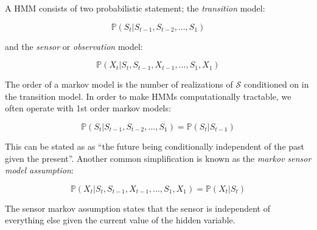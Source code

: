 \documentclass[11pt, oneside, a4paper]{report}
\begin{document}
A HMM consists of two probabilistic statement; the \emph{transition}
model:

\begin{equation}
\mathbb{P}(S_t|S_{t-1}, S_{t-2},...,S_1)
\end{equation}


and the \emph{sensor} or \emph{observation} model:

\begin{equation}
\mathbb{P}(X_t|S_t, S_{t-1}, X_{t-1}, ...,
S_1, X_1)
\end{equation}


 The order of a markov model is the number of realizations
of $\mathcal{S}$ conditioned on in the transition model. In order to
make HMMs computationally tractable, we often operate with 1st order
markov models:

\begin{equation}\label{1st_order_markov}
  \mathbb{P}(S_t|S_{t-1}, S_{t-2},...,S_1)  =  \mathbb{P}(S_t|S_{t-1})
\end{equation}

This can be stated as as ``the future being conditionally independent of
the past given the present''. Another common simplification is known as the \emph{markov sensor model assumption}:


\begin{equation}
  \mathbb{P}(X_t|S_t, S_{t-1}, X_{t-1}, ...,
  S_1, X_1) = \mathbb{P}(X_t|S_t)  
\end{equation}

The sensor markov assumption states that the sensor is independent of
everything else given the current value of the hidden variable.


\end{document}

